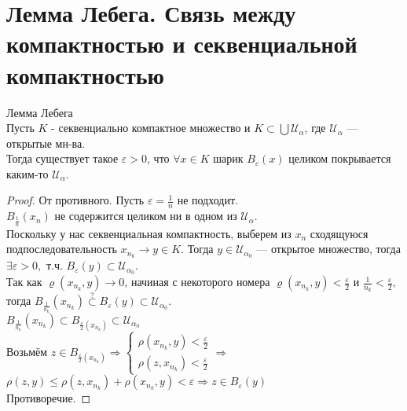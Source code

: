 \section{Лемма Лебега. Связь между компактностью и секвенциальной компактностью}

\begin{lemma}
    Лемма Лебега \\
    
    Пусть $K$ - секвенциально компактное множество
    и $K \subset \bigcup \mathcal{U_{\alpha}}$, где $\mathcal{U_{\alpha}}$ --- открытые мн-ва. \\
    Тогда существует такое $\varepsilon > 0$, что $\forall x \in K$ шарик $B_{\varepsilon}(x)$ целиком покрывается каким-то $\mathcal{U_{\alpha}}$.
    \begin{proof}
        От противного. Пусть $\varepsilon = \frac{1}{n}$ не подходит. \\
         $B_{\frac{1}{n}}(x_n)$ не содержится целиком ни в одном из $\mathcal{U_{\alpha}}$.  \\
         Поскольку у нас секвенциальная компактность, выберем из $x_n$ сходящуюся подпоследовательность $x_{n_k} \rightarrow y \in K$.
         Тогда $y \in \mathcal{U}_{{\alpha}_0}$ --- открытое множество, тогда $\exists \varepsilon > 0,$ т.ч. $B_{\varepsilon}(y) \subset \mathcal{U}_{{\alpha}_0}$. \\
         Так как $\varrho(x_{n_k},y)\rightarrow 0$, начиная с некоторого номера $\varrho(x_{n_k},y) < \frac{\varepsilon}{2}$ и $\frac{1}{n_k} < \frac{\varepsilon}{2}$, \\
         тогда $B_{\frac{1}{n_k}}(x_{n_k}) \stackrel{?}{\subset} B_{\varepsilon}(y) \subset \mathcal{U}_{{\alpha}_0}$. \\
         $B_{\frac{1}{n_k}}(x_{n_k}) \subset B_{\frac{\varepsilon}{2}(x_{n_k})} \subset \mathcal{U}_{{\alpha}_0}$ \\
         Возьмём $z \in B_{\frac{\varepsilon}{2}(x_{n_k})} \Longrightarrow 
         \begin{cases}
             \rho(x_{n_k},y) < \frac{\varepsilon}{2} \\
             \rho(z,x_{n_k}) < \frac{\varepsilon}{2}
         \end{cases} \Longrightarrow$ 
        $\rho(z,y) \leqslant \rho (z, x_{n_k}) + \rho (x_{n_k},y) < \varepsilon \Longrightarrow z \in B_{\varepsilon}(y)$ \\
        Противоречие.
    \end{proof}

\end{lemma}

